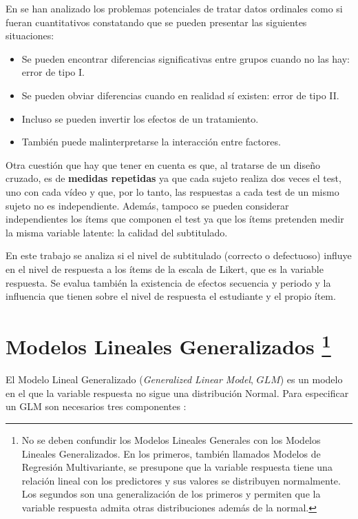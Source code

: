 \documentclass[
  12pt,
  a4paper,
  extrafontsizes,
  onecolumn,
  openright,
  table]{memoir}
\providecommand{\tightlist}{%
  \setlength{\itemsep}{0pt}\setlength{\parskip}{0pt}}\usepackage{longtable,booktabs,array}
\begin{document}
En \textcite{kruschke2018} se han analizado los problemas potenciales de
tratar datos ordinales como si fueran cuantitativos constatando que se
pueden presentar las siguientes situaciones:

\begin{itemize}
\tightlist
\item
  Se pueden encontrar diferencias significativas entre grupos cuando no
  las hay: \gls{error de tipo I}.
\item
  Se pueden obviar diferencias cuando en realidad sí existen:
  \gls{error de tipo II}.
\item
  Incluso se pueden invertir los efectos de un tratamiento.
\item
  También puede malinterpretarse la interacción entre factores.
\end{itemize}

Otra cuestión que hay que tener en cuenta es que, al tratarse de un
diseño cruzado, es de \textbf{medidas repetidas} ya que cada sujeto
realiza dos veces el test, uno con cada vídeo y que, por lo tanto, las
respuestas a cada test de un mismo sujeto no es independiente. Además,
tampoco se pueden considerar independientes los ítems que componen el
test ya que los ítems pretenden medir la misma variable latente: la
calidad del subtitulado.

En este trabajo se analiza si el nivel de subtitulado (correcto o
defectuoso) influye en el nivel de respuesta a los ítems de la escala de
Likert, que es la variable respuesta. Se evalua también la existencia de
efectos secuencia y periodo y la influencia que tienen sobre el nivel de
respuesta el estudiante y el propio ítem.

\hypertarget{sec-glm}{%
\section[Modelos Lineales Generalizados ]{\texorpdfstring{Modelos
Lineales Generalizados
\footnote{No se deben confundir los Modelos Lineales Generales con los
  Modelos Lineales Generalizados. En los primeros, también llamados
  Modelos de Regresión Multivariante, se presupone que la variable
  respuesta tiene una relación lineal con los predictores y sus valores
  se distribuyen normalmente. Los segundos son una generalización de los
  primeros y permiten que la variable respuesta admita otras
  distribuciones además de la normal.}}{Modelos Lineales Generalizados }}\label{sec-glm}}

El Modelo Lineal Generalizado (\emph{Generalized Linear Model}, \(GLM\))
es un modelo en el que la variable respuesta no sigue una distribución
Normal. Para especificar un \gls{GLM} son necesarios tres componentes
\autocite[ver][pp.~66-67]{agresti_2018}:
\end{document}

